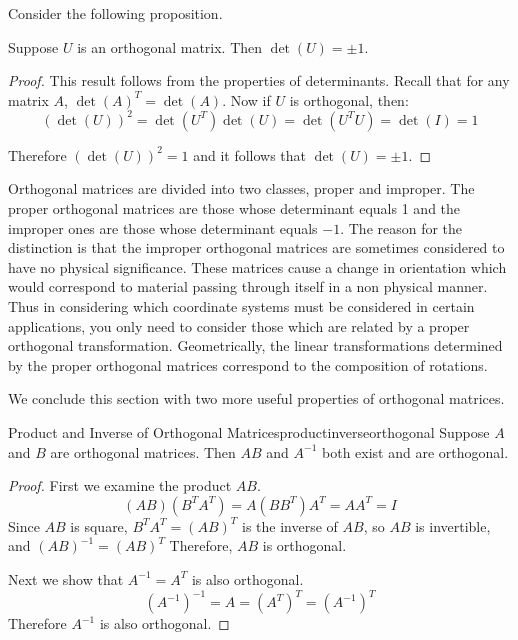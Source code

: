 \documentclass{ximera}
\begin{document}
Consider the following proposition.

\begin{theorem}\label{orthoDet}
Suppose $U$ is an orthogonal matrix. Then $\det \left( U\right) = \pm 1.$
\end{theorem}

\begin{proof}
This result follows from the properties of determinants. Recall that
for any matrix $A$, $\det(A)^T = \det(A)$. Now if $U$ is orthogonal, then:
\begin{equation*}
(\det \left( U\right)) ^{2}=\det \left( U^{T}\right) \det \left( U\right)
=\det \left( U^{T}U\right) =\det \left( I\right) =1
\end{equation*}

Therefore $(\det (U))^2 = 1$ and it follows that $\det \left( U\right) = \pm 1$.
\end{proof}

Orthogonal matrices are divided into two classes, proper and improper.
The proper orthogonal matrices are those whose determinant equals 1
and the improper ones are those whose determinant equals $-1$. The
reason for the distinction is that the improper orthogonal matrices
are sometimes considered to have no physical significance. These
matrices cause a change in orientation which would correspond to
material passing through itself in a non physical manner. Thus in
considering which coordinate systems must be considered in certain
applications, you only need to consider those which are related by a
proper orthogonal transformation. Geometrically, the linear
transformations determined by the proper orthogonal matrices
correspond to the composition of rotations.

We conclude this section with two more useful properties of orthogonal matrices.

\begin{theorem}{Product and Inverse of Orthogonal Matrices}{productinverseorthogonal}
Suppose $A$ and $B$ are orthogonal matrices. Then $AB$ and $A^{-1}$ both exist and are orthogonal.
\end{theorem}

\begin{proof}
First we examine the product $AB$.
\[ (AB)(B^TA^T)=A(BB^T)A^T =AA^T=I \]
Since $AB$ is square, $B^TA^T=(AB)^T$ is the inverse of
$AB$, so $AB$ is invertible, and $(AB)^{-1}=(AB)^T$
Therefore, $AB$ is orthogonal.

Next we show that $A^{-1}=A^T$ is also orthogonal.
\[ (A^{-1})^{-1} = A = (A^T)^{T}
=(A^{-1})^{T} \]
Therefore $A^{-1}$ is also orthogonal.
\end{proof} 
\end{document}
